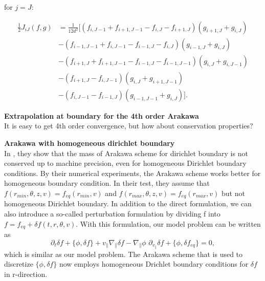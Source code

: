 for $j=J$:

\begin{equation}
\begin{aligned}
\frac{1}{2}J_{iJ} (f,g) &=\frac{1}{12d^2}[(f_{i,J-1}+f_{i+1,J-1}-f_{i,J}-f_{i+1,J})(g_{i+1,J}+g_{i,J})\\
&-(f_{i-1,J-1}+f_{i,J-1}-f_{i-1,J}-f_{i,J})(g_{i-1,J}+g_{i,J})\\
&-(f_{i+1,J}+f_{i+1,J-1}-f_{i-1,J}-f_{i-1,J-1})(g_{i,J}+g_{i,J-1})\\
&-(f_{i+1,J}-f_{i,J-1})(g_{i,J}+g_{i+1,J-1})\\
&-(f_{i,J-1}-f_{i-1,J})(g_{i-1,J-1}+g_{i,J})].
\end{aligned}
\end{equation}

\textbf{Extrapolation at boundary for the 4th order Arakawa}\\
It is easy to get 4th order convergence, but how about conservation properties?

\textbf{Arakawa with homogeneous dirichlet boundary}\\
In \cite{crouseilles2018exponential}, they show that the mass of Arakawa scheme for dirichlet boundary is not conserved up to machine precision, even for homogeneous Dirichlet boundary conditions. By their numerical experiments, the Arakawa scheme works better for homogeneous boundary condition. In their test, they assume that $f(r_{min}, \theta,z,v)=f_{eq}(r_{min},v)$ and $f(r_{max}, \theta,z,v)=f_{eq}(r_{max},v)$ but not homogeneous Dirichlet boundary. In addition to the direct formulation, we can also introduce a so-called perturbation formulation by dividing f into $f=f_{eq}+\delta f(t,r,\theta,v)$. With this formulation, our model problem can be written as 
\begin{equation}
 \partial_t \delta f + \{\phi, \delta f \} + v_\parallel \nabla_\parallel \delta f - \nabla_\parallel \phi\,\, \partial_{v_\parallel} \delta f + \{\phi, \delta f_{eq} \}= 0,
\end{equation} 
which is similar as our model problem. The Arakawa scheme that is used to discretize $\{\phi, \delta f \}$ now employs homogeneous Drichlet boundary conditions for $\delta f$ in r-direction.